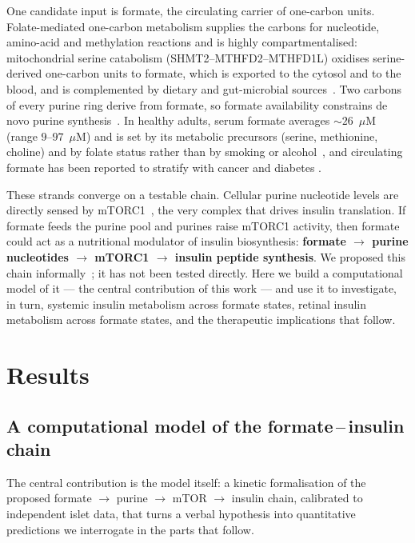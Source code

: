 \documentclass[10pt,letterpaper]{article}
\begin{document}
One candidate input is formate, the
circulating carrier of one-carbon units. Folate-mediated one-carbon metabolism
supplies the carbons for nucleotide, amino-acid and methylation reactions and is
highly compartmentalised: mitochondrial serine catabolism
(SHMT2--MTHFD2--MTHFD1L) oxidises serine-derived one-carbon units to formate,
which is exported to the cytosol and to the blood, and is complemented by dietary
and gut-microbial sources~\cite{ducker2017,pietzke2020}. Two carbons of every purine ring derive from formate, so formate
availability constrains de novo purine synthesis~\cite{oizel2020}. In
healthy adults, serum formate averages ${\sim}26$~$\mu$M (range $9$--$97$~$\mu$M)
and is set by its metabolic precursors (serine, methionine, choline) and by folate
status rather than by smoking or alcohol~\cite{brosnan2018}, and
circulating formate has been reported to stratify with cancer and diabetes
\cite{pietzke2019}.

These strands converge on a testable chain. Cellular
purine nucleotide levels are directly sensed by mTORC1~\cite{hoxhaj2017}, the very complex that drives insulin translation. If formate feeds the
purine pool and purines raise mTORC1 activity, then formate could act as a
nutritional modulator of insulin biosynthesis:
\textbf{formate $\rightarrow$ purine nucleotides $\rightarrow$ mTORC1 $\rightarrow$
insulin peptide synthesis}. We proposed this chain informally~\cite{spiceoflife}; it has not been tested directly. Here we build a computational
model of it --- the central contribution of this work --- and use it to
investigate, in turn, systemic insulin metabolism across formate states, retinal
insulin metabolism across formate states, and the therapeutic implications that
follow.

\section*{Results}

\subsection*{A computational model of the formate\,--\,insulin chain}
The central contribution is the model itself: a kinetic formalisation of the
proposed formate $\rightarrow$ purine $\rightarrow$ mTOR $\rightarrow$ insulin chain,
calibrated to independent islet data, that turns a verbal hypothesis into
quantitative predictions we interrogate in the parts that follow.
\end{document}
